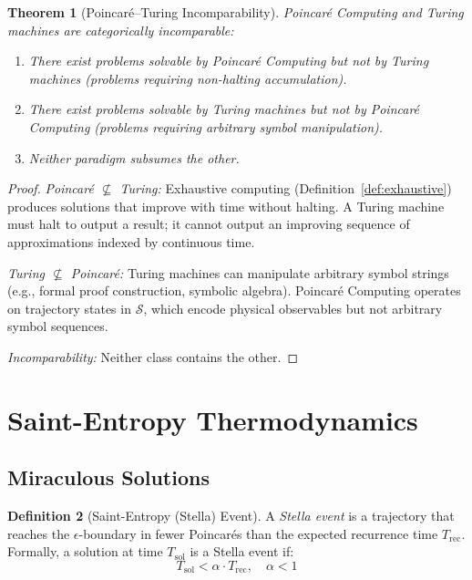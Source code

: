 \documentclass[twocolumn,10pt,a4paper]{article}
\theoremstyle{plain}
\newtheorem{theorem}{Theorem}[section]
\theoremstyle{definition}
\newtheorem{definition}[theorem]{Definition}
\theoremstyle{remark}
\newcommand{\Sspace}{\mathcal{S}}
\begin{document}
\begin{theorem}[Poincar\'{e}--Turing Incomparability]
\label{thm:incomparability}
Poincar\'{e} Computing and Turing machines are categorically incomparable:
\begin{enumerate}
    \item There exist problems solvable by Poincar\'{e} Computing but not by Turing machines (problems requiring non-halting accumulation).
    \item There exist problems solvable by Turing machines but not by Poincar\'{e} Computing (problems requiring arbitrary symbol manipulation).
    \item Neither paradigm subsumes the other.
\end{enumerate}
\end{theorem}

\begin{proof}
\emph{Poincar\'{e} $\not\subseteq$ Turing:} Exhaustive computing (Definition~\ref{def:exhaustive}) produces solutions that improve with time without halting. A Turing machine must halt to output a result; it cannot output an improving sequence of approximations indexed by continuous time.

\emph{Turing $\not\subseteq$ Poincar\'{e}:} Turing machines can manipulate arbitrary symbol strings (e.g., formal proof construction, symbolic algebra). Poincar\'{e} Computing operates on trajectory states in $\Sspace$, which encode physical observables but not arbitrary symbol sequences.

\emph{Incomparability:} Neither class contains the other.
\end{proof}

\section{Saint-Entropy Thermodynamics}
\label{sec:saint_entropy}

\subsection{Miraculous Solutions}

\begin{definition}[Saint-Entropy (Stella) Event]
\label{def:stella}
A \emph{Stella event} is a trajectory that reaches the $\epsilon$-boundary in fewer Poincar\'{e}s than the expected recurrence time $T_{\mathrm{rec}}$. Formally, a solution at time $T_{\mathrm{sol}}$ is a Stella event if:
\begin{equation}
    T_{\mathrm{sol}} < \alpha \cdot T_{\mathrm{rec}}, \quad \alpha < 1
\end{equation}
\end{definition}
\end{document}
